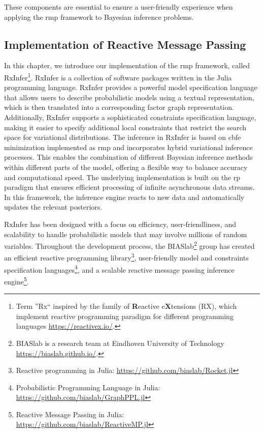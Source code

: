 These components are essential to ensure a user-friendly experience when applying the \ac{rmp}
framework to Bayesian inference problems.

\subsection*{Implementation of Reactive Message Passing}

In this chapter, we introduce our implementation of the \ac{rmp} framework, called RxInfer\footnote{Term ''Rx`` inspired by the family of \textbf{R}eactive e\textbf{X}tensions (RX), which implement reactive programming paradigm for different programming languages \url{https://reactivex.io/}.}.
RxInfer is a collection of software packages written in the Julia programming language.
RxInfer provides a powerful model specification language that allows users to describe
probabilistic models using a textual representation, which is then translated into a
corresponding factor graph representation.
Additionally, RxInfer supports a sophisticated constraints specification language, making it
easier to specify additional local constraints that restrict the search
space for variational distributions.
The inference in RxInfer is based on \ac{cbfe} minimization implemented as \ac{rmp} and
incorporates hybrid variational inference processes.
This enables the combination of different Bayesian inference methods within different parts of
the model, offering a flexible way to balance accuracy and computational speed.
The underlying implementation is built on the \ac{rp} paradigm that ensures
efficient processing of infinite asynchronous data streams.
In this framework, the inference engine reacts to new data and automatically updates the relevant
posteriors.

RxInfer has been designed with a focus on efficiency, user-friendliness, and scalability to
handle probabilistic models that may involve millions of random variables.
Throughout the development process, the BIASlab\footnote{BIASlab is a research team at Eindhoven University of Technology \url{https://biaslab.github.io/}.} group has created an efficient reactive
programming library\footnote{Reactive programming in Julia: \url{https://github.com/biaslab/Rocket.jl}}, user-friendly model and constraints specification languages\footnote{Probabilistic Programming Language in Julia: \url{https://github.com/biaslab/GraphPPL.jl}}, and a
scalable reactive message passing inference engine\footnote{Reactive Message Passing in Julia: \url{https://github.com/biaslab/ReactiveMP.jl}}.


